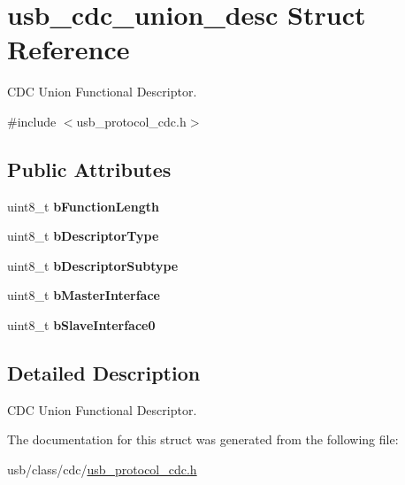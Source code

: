 \hypertarget{structusb__cdc__union__desc}{}\section{usb\+\_\+cdc\+\_\+union\+\_\+desc Struct Reference}
\label{structusb__cdc__union__desc}


C\+DC Union Functional Descriptor.  




{\ttfamily \#include $<$usb\+\_\+protocol\+\_\+cdc.\+h$>$}

\subsection*{Public Attributes}
\begin{DoxyCompactItemize}
\item 
\mbox{\label{structusb__cdc__union__desc_ac3314cfd2a15e4b92abe41531306f1e4}} 
uint8\+\_\+t {\bfseries b\+Function\+Length}
\item 
\mbox{\label{structusb__cdc__union__desc_ae1173e2e000d0efd10a14bdeb5fb7219}} 
uint8\+\_\+t {\bfseries b\+Descriptor\+Type}
\item 
\mbox{\label{structusb__cdc__union__desc_af72c664dd03ce74dd62f52bea6237748}} 
uint8\+\_\+t {\bfseries b\+Descriptor\+Subtype}
\item 
\mbox{\label{structusb__cdc__union__desc_adaf215cfbac3c5eb8936346dac98908e}} 
uint8\+\_\+t {\bfseries b\+Master\+Interface}
\item 
\mbox{\label{structusb__cdc__union__desc_a924c70bb7709dd8dd5a2196b2d97fc95}} 
uint8\+\_\+t {\bfseries b\+Slave\+Interface0}
\end{DoxyCompactItemize}


\subsection{Detailed Description}
C\+DC Union Functional Descriptor. 

The documentation for this struct was generated from the following file\+:\begin{DoxyCompactItemize}
\item 
usb/class/cdc/\hyperlink{usb__protocol__cdc_8h}{usb\+\_\+protocol\+\_\+cdc.\+h}\end{DoxyCompactItemize}
